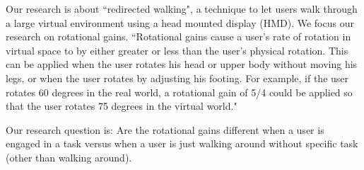 Our research is about ``redirected walking", a technique to let users walk through a large virtual environment using a head mounted display (HMD).
We focus our research on rotational gains.
``Rotational gains cause a user's rate of rotation in virtual space to by either greater or less than 
the user's physical rotation. This can be applied when the user rotates his head or upper body 
without moving his legs, or when the user rotates by adjusting his footing. For example, if the 
user rotates 60 degrees in the real world, a rotational gain of 5/4 could be applied so that the 
user rotates 75 degrees in the virtual world."\cite{jwalker}

Our research question is: Are the rotational gains different when a user is engaged in a task versus when a user is just walking around without specific task (other than walking around).
